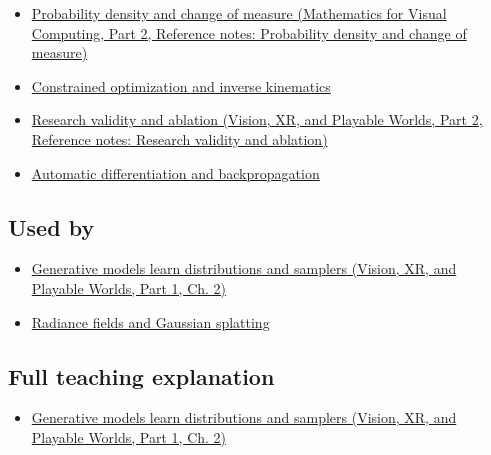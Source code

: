 \hypertarget{appendix-2c568f05ee34-prerequisites}{}

\begin{itemize}
\tightlist
\item
  \href{../02-Mathematics-for-Visual-Computing-P02/main.pdf\#nameddest=appendix-4815cd87ab8b}{Probability density and change of measure (Mathematics for Visual Computing, Part 2, Reference notes: Probability density and change of measure)}
\item
  \hyperref[appendix-29f4bea4c2bb]{Constrained optimization and inverse kinematics}
\item
  \href{../07-Vision-XR-and-Playable-Worlds-P02/main.pdf\#nameddest=appendix-65788587ef78}{Research validity and ablation (Vision, XR, and Playable Worlds, Part 2, Reference notes: Research validity and ablation)}
\item
  \hyperref[appendix-40df0855b4a7]{Automatic differentiation and backpropagation}
\end{itemize}

\subsection{Used by}\label{appendix-2c568f05ee34-used-by}

\hypertarget{appendix-2c568f05ee34-used-by}{}

\begin{itemize}
\tightlist
\item
  \href{../07-Vision-XR-and-Playable-Worlds-P01/main.pdf\#nameddest=04-visual-computing-ii-ch031-generative-models-learn-distributions-and-samplers}{Generative models learn distributions and samplers (Vision, XR, and Playable Worlds, Part 1, Ch. 2)}
\item
  \hyperref[appendix-c5b332e400e7]{Radiance fields and Gaussian splatting}
\end{itemize}

\subsection{Full teaching explanation}\label{appendix-2c568f05ee34-full-teaching-explanation}

\hypertarget{appendix-2c568f05ee34-full-teaching-explanation}{}

\begin{itemize}
\tightlist
\item
  \href{../07-Vision-XR-and-Playable-Worlds-P01/main.pdf\#nameddest=04-visual-computing-ii-ch031-generative-models-learn-distributions-and-samplers}{Generative models learn distributions and samplers (Vision, XR, and Playable Worlds, Part 1, Ch. 2)}
\end{itemize}

